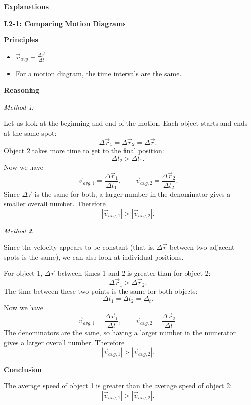 \documentclass[]{article}
\begin{document}
\begin{TeacherMargin}
\noindent\textbf{Explanations}

\noindent\textbf{L2-1: Comparing Motion Diagrams}

\noindent\textbf{Principles}
\begin{itemize}
	\item $\vec{v}_{avg} = \frac{\Delta\vec{r}}{\Delta t}$
	\item For a motion diagram, the time intervals are the same.
\end{itemize}
\noindent\textbf{Reasoning}

\noindent\textit{Method 1:}

Let us look at the beginning and end of the motion. Each object starts and ends at the same spot:
\[
\Delta\vec{r}_{1} = \Delta\vec{r}_{2} = \Delta\vec{r}.
\]
Object 2 takes more time to get to the final position:
\[
\Delta t_{2} > \Delta t_{1}.
\]
Now we have
\[
\vec{v}_{avg,1} = \frac{\Delta\vec{r}_{1}}{\Delta t_{1}}, \qquad \vec{v}_{avg,2} = \frac{\Delta\vec{r}_{2}}{\Delta t_{2}}.
\]
Since $\Delta\vec{r}$ is the same for both, a larger number in the denominator gives a smaller overall number. Therefore
\[
\left|\vec{v}_{avg,1}\right| > \left|\vec{v}_{avg,2}\right|.
\]

\noindent\textit{Method 2:}

Since the velocity appears to be constant (that is, $\Delta\vec{r}$ between two adjacent spots is the same), we can also look at individual positions.

For object 1, $\Delta\vec{r}$ between times 1 and 2 is greater than for object 2:
\[
\Delta\vec{r}_{1} > \Delta\vec{r}_{2}.
\]
The time between these two points is the same for both objects:
\[
\Delta t_{1} = \Delta t_{2} = \Delta _{t}.
\]
Now we have
\[
\vec{v}_{avg,1} = \frac{\Delta\vec{r}_{1}}{\Delta t}, \qquad \vec{v}_{avg,2} = \frac{\Delta\vec{r}_{2}}{\Delta t}.
\]
The denominators are the same, so having a larger number in the numerator gives a larger overall number. Therefore
\[
\left|\vec{v}_{avg,1}\right| > \left|\vec{v}_{avg,2}\right|.
\]

\noindent\textbf{Conclusion}

The average speed of object 1 is \underline{greater than} the average speed of object 2:
\[
\left|\vec{v}_{avg,1}\right| > \left|\vec{v}_{avg,2}\right|.
\]
\end{TeacherMargin}
\end{document}
